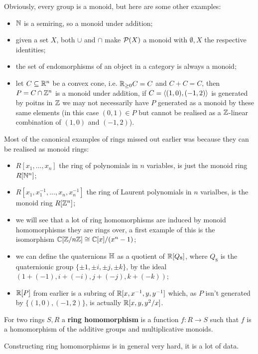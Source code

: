 \documentclass{article}
\begin{document}
Obviously, every group is a monoid, but here are some other examples:\begin{itemize}
    \item $\mathbb{N}$ is a semiring, so a monoid under addition;
    \item given a set $X$, both $\cup$ and $\cap$ make $\mathcal{P}(X)$ a monoid with $\emptyset,X$ the respective identities;
    \item the set of endomorphisms of an object in a category is always a monoid;
    \item let $C\subseteq \mathbb{R}^n$ be a convex cone, i.e. $\mathbb{R}_{\geq 0}C = C$ and $C+C = C$, then $P=C\cap\mathbb{Z}^n$ is a monoid under addition, if $C=\left\langle (1,0),(-1,2) \right\rangle$ is generated by poitns in $\mathbb{Z}$ we may not necessarily have $P$ generated as a monoid by these same elements (in this case $(0,1)\in P$ but cannot be realised as a $\mathbb{Z}$-linear combination of $(1,0)$ and $(-1,2)$).
\end{itemize}

Most of the canonical examples of rings missed out earlier was because they can be realised as monoid rings: \begin{itemize}
    \item $R[x_1,\ldots,x_n]$ the ring of polynomials in $n$ variables, is just the monoid ring $R[\mathbb{N}^n]$;
    \item $R[x_1,x_1^{-1},\ldots,x_n,x_n^{-1}]$ the ring of Laurent polynomials in $n$ varialbes, is the monoid ring $R[\mathbb{Z}^n]$;
    \item we will see that a lot of ring homomorphisms are induced by monoid homomorphisms they are rings over, a first example of this is the isomorphism $\mathbb{C}[\mathbb{Z}/n\mathbb{Z}]\cong\mathbb{C}[x]/(x^n-1)$;
    \item we can define the quaternions $\mathbb{H}$ as a quotient of $\mathbb{R}[Q_8]$, where $Q_8$ is the quaternionic group $\{\pm 1,\pm i, \pm j,\pm k\}$, by the ideal $(1 + (-1), i + (-i),j+(-j),k+(-k))$;
    \item $\mathbb{R}[P]$ from earlier is a subring of $\mathbb{R}[x,x^{-1},y,y^{-1}]$ which, as $P$ isn't generated by $\{(1,0),(-1,2)\}$, is actually $\mathbb{R}[x,y,y^2/x]$.
\end{itemize}

\begin{definition}
    For two rings $S,R$ a \textbf{ring homomorphism} is a function $f:R\rightarrow S$ such that $f$ is a homomorphism of the additive groups and multiplicative monoids.
\end{definition}

Constructing ring homomorphisms is in general very hard, it is a lot of data.
\end{document}
